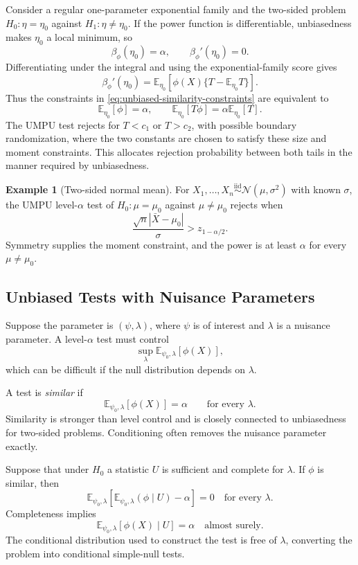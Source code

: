 \documentclass[12pt,oneside]{book}
\numberwithin{equation}{section}
\theoremstyle{definition}
\newtheorem{example}{Example}[section]
\theoremstyle{plain}
\theoremstyle{remark}
\newcommand{\E}{\mathbb{E}}
\newcommand{\iid}{\overset{\text{iid}}{\sim}}
\newcommand{\abs}[1]{\left\lvert #1 \right\rvert}
\newcommand{\Normal}{\mathcal{N}}
\begin{document}
Consider a regular one-parameter exponential family and the two-sided problem
$H_0:\eta=\eta_0$ against $H_1:\eta\neq\eta_0$.  If the power function is
differentiable, unbiasedness makes $\eta_0$ a local minimum, so
\begin{equation}
    \beta_\phi(\eta_0)=\alpha,
    \qquad \beta_\phi'(\eta_0)=0.
    \label{eq:unbiased-similarity-constraints}
\end{equation}
Differentiating under the integral and using the exponential-family score
gives
\[
 \beta_\phi'(\eta_0)
 =\E_{\eta_0}[\phi(X)\{T-\E_{\eta_0}T\}].
\]
Thus the constraints in \eqref{eq:unbiased-similarity-constraints} are
equivalent to
\[
    \E_{\eta_0}[\phi]=\alpha,
    \qquad
    \E_{\eta_0}[T\phi]=\alpha\E_{\eta_0}[T].
\]
The UMPU test rejects for $T<c_1$ or $T>c_2$, with possible boundary
randomization, where the two constants are chosen to satisfy these size and
moment constraints.  This allocates rejection probability between both tails
in the manner required by unbiasedness.

\begin{example}[Two-sided normal mean]
For $X_1,\ldots,X_n\iid\Normal(\mu,\sigma^2)$ with known $\sigma$, the UMPU
level-$\alpha$ test of $H_0:\mu=\mu_0$ against $\mu\neq\mu_0$ rejects when
\[
    \frac{\sqrt n\abs{\bar X-\mu_0}}{\sigma}>z_{1-\alpha/2}.
\]
Symmetry supplies the moment constraint, and the power is at least $\alpha$
for every $\mu\neq\mu_0$.
\end{example}

\subsection{Unbiased Tests with Nuisance Parameters}

Suppose the parameter is $(\psi,\lambda)$, where $\psi$ is of interest and
$\lambda$ is a nuisance parameter.  A level-$\alpha$ test must control
\[
    \sup_{\lambda}\E_{\psi_0,\lambda}[\phi(X)],
\]
which can be difficult if the null distribution depends on $\lambda$.

A test is \emph{similar} if
\begin{equation}
    \E_{\psi_0,\lambda}[\phi(X)]=\alpha
    \qquad\text{for every }\lambda.
    \label{eq:similar-test}
\end{equation}
Similarity is stronger than level control and is closely connected to
unbiasedness for two-sided problems.  Conditioning often removes the nuisance
parameter exactly.

Suppose that under $H_0$ a statistic $U$ is sufficient and complete for
$\lambda$.  If $\phi$ is similar, then
\[
 \E_{\psi_0,\lambda}
 \left[\E_{\psi_0,\lambda}(\phi\mid U)-\alpha\right]=0
 \quad\text{for every }\lambda.
\]
Completeness implies
\begin{equation}
    \E_{\psi_0,\lambda}[\phi(X)\mid U]=\alpha
    \quad\text{almost surely}.
    \label{eq:conditional-similarity}
\end{equation}
The conditional distribution used to construct the test is free of
$\lambda$, converting the problem into conditional simple-null tests.
\end{document}
